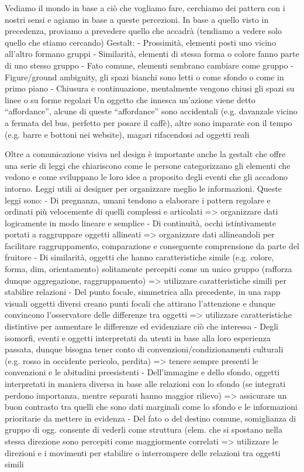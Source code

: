 Vediamo il mondo in base a ciò che vogliamo fare, cerchiamo dei pattern con i nostri sensi e agiamo in base a queste percezioni. In base a quello visto in precedenza, proviamo a prevedere quello che accadrà (tendiamo a vedere solo quello che stiamo cercando)
Gestalt:
-	Prossimità, elementi posti uno vicino all'altro formano gruppi
-	Similarità, elementi di stessa forma o colore fanno parte di uno stesso gruppo
-	Fato comune, elementi sembrano cambiare come gruppo
-	Figure/ground ambiguity, gli spazi bianchi sono letti o come sfondo o come in primo piano
-	Chiusura e continuazione, mentalmente vengono chiusi gli spazi su linee o su forme regolari 
Un oggetto che innesca un'azione viene detto “affordance”, alcune di queste “affordance” sono accidentali (e.g. davanzale vicino a fermata del bus, perfetto per posare il caffè), altre sono imparate con il tempo (e.g. barre e bottoni nei website), magari rifacendosi ad oggetti reali

Oltre a comunicazione visiva nel design è importante anche la gestalt che offre una serie di leggi che chiariscono come le persone categorizzano gli elementi che vedono e come sviluppano le loro idee a proposito degli eventi che gli accadono intorno. Leggi utili ai designer per organizzare meglio le informazioni. Queste leggi sono:
-	Di pregnanza, umani tendono a elaborare i pattern regolare e ordinati più velocemente di quelli complessi e articolati => organizzare dati logicamente in modo lineare e semplice
-	Di continuità, occhi istintivamente portati a raggruppare oggetti allineati => organizzare dati allineandoli per facilitare raggruppamento, comparazione e conseguente comprensione da parte del fruitore
-	Di similarità, oggetti che hanno caratteristiche simile (e.g. colore, forma, dim, orientamento) solitamente percepiti come un unico gruppo (rafforza dunque aggregazione, raggruppamento) => utilizzare caratteristiche simili per stabilire relazioni
-	Del punto focale, simmetrica alla precedente, in una rapp visuali oggetti diversi creano punti focali che attirano l'attenzione e dunque convincono l'osservatore delle differenze tra oggetti => utilizzare caratteristiche distintive per aumentare le differenze ed evidenziare ciò che interessa
-	Degli isomorfi, eventi e oggetti interpretati da utenti in base alla loro esperienza passata, dunque bisogna tener conto di convenzioni/condizionamenti culturali (e.g. rosso in occidente pericolo, perdita) => tenere sempre presenti le convenzioni e le abitudini preesistenti
-	Dell'immagine e dello sfondo, oggetti interpretati in maniera diversa in base alle relazioni con lo sfondo (se integrati perdono importanza, mentre separati hanno maggior rilievo) => assicurare un buon contrasto tra quelli che sono dati marginali come lo sfondo e le informazioni prioritarie da mettere in evidenza
-	Del fato o del destino comune, somiglianza di gruppo di ogg. consente di vederli come struttura (elem. che si spostano nella stessa direzione sono percepiti come maggiormente correlati => utilizzare le direzioni e i movimenti per stabilire o interrompere delle relazioni tra oggetti simili




